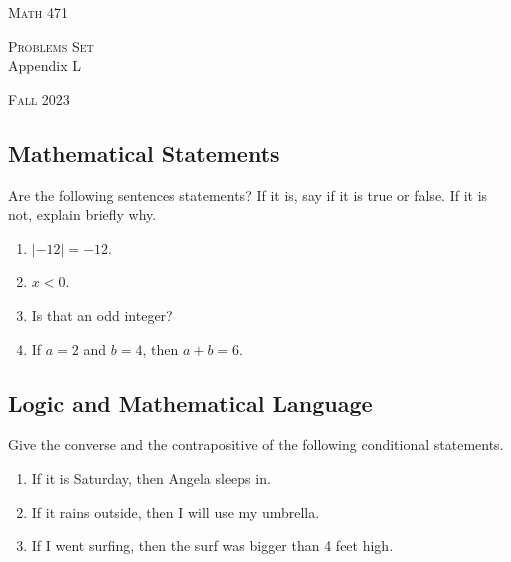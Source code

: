 


\hrulefill

\begin{minipage}{0.33\textwidth}
\textsc{Math 471}
\end{minipage} \hfill 
\begin{minipage}{0.32\textwidth}
\centering
\textsc{Problems Set} \\
Appendix L
\end{minipage}
 \hfill 
 \begin{minipage}{0.33\textwidth}
 \flushright \textsc{Fall 2023}
 \end{minipage}

\hrulefill

\setcounter{section}{12}

 \subsection[~~Mathematical Statements]{Mathematical Statements}

 \begin{problem}
 Are the following sentences statements? If it is, say if it is true or false. If it is not, explain briefly why.
 	\begin{enumerate}[label=\alph*)]
 	\item $|-12| = -12$.
 	\item $x < 0$.
 	\item Is that an odd integer?
 	\item If $a= 2$ and $b = 4$, then $a + b = 6$.
 	\end{enumerate}
 \end{problem}

 \subsection[~~Logic and Mathematical Language]{Logic and Mathematical Language}

 \begin{problem}
Give the converse and the contrapositive of the following conditional statements.
 	\begin{enumerate}[label=\alph*)]
 		\item If it is Saturday, then Angela sleeps in.
 		\item If it rains outside, then I will use my umbrella.
 		\item If I went surfing, then the surf was bigger than 4 feet high.
 	\end{enumerate}
 \end{problem}

